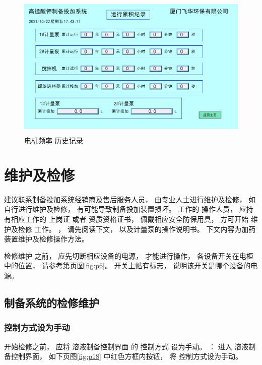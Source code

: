 \documentclass[UTF8,a4paper,12pt,titlepage]{ctexart}
\begin{document}
            \begin{figure}[h]
                \centering
                \includegraphics[height=7cm]{g11.PNG}
                \caption{电机频率 历史记录}\label{fig:p17}
            \end{figure}

\section{维护及检修}
   建议联系制备投加系统经销商及售后服务人员，
   由专业人士进行维护及检修，
   如自行进行维护及检修，
   有可能导致制备投加装置损坏。
    工作的 操作人员，
   应持有相应工作的 上岗证 或者 资质资格证书，
   佩戴相应安全防保用具，
   方可开始 维护及检修 工作。
   ，
   请先阅读下文，
   以及计量泵的操作说明书。
   下文内容为加药装置维护及检修操作方法。

     检修维护 之前，
    应先切断相应设备的电源，
    才能进行操作，
    各设备开关在电柜中的位置， 
    请参考第\pageref{sec:power-on}页图\ref{fig:p6}。
    开关上贴有标志，
    说明该开关是哪个设备的电源。

   \subsection{制备系统的检修维护}

        \subsubsection{控制方式设为手动} 
            开始检修之前，
            应将 溶液制备控制界面 的 控制方式 设为手动。
            ：
            进入 溶液制备控制界面，
            如下页图\ref{fig:p18} 中红色方框内按钮，
            将 控制方式设为手动。
\end{document}
